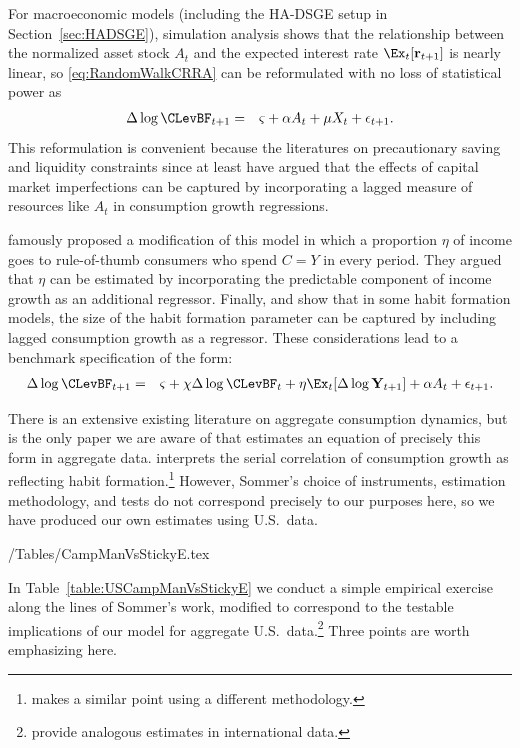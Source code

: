 \documentclass[titlepage]{\econtex}\newcommand{\texname}{cAndCwithStickyE}
\begin{document}
For macroeconomic models (including the HA-DSGE setup in Section~\ref{sec:HADSGE}), simulation analysis shows that the relationship between the normalized asset stock $A_{t}$ and the expected interest rate $\Ex_{t}[\mathbf{r}_{t+1}]$ is nearly linear, so \eqref{eq:RandomWalkCRRA} can be reformulated with no loss of statistical power as
\begin{eqnarray*}
  \label{eq:RandomWalkAForm}
  \Delta \log \CLevBF_{t+1} & = & \varsigma+\alpha A_{t}+\mu X_{t}+\epsilon_{t+1}.
\end{eqnarray*}
This reformulation is convenient because the literatures on precautionary saving and liquidity constraints since at least \cite{zeldes:jpe,zeldesStochastic} have argued that the effects of capital market imperfections can be captured by incorporating a lagged measure of resources like $A_{t}$ in consumption growth regressions.

\cite{cmModel} famously proposed a modification of this model in which a proportion $\eta$ of income goes to rule-of-thumb consumers who spend $C=Y$ in every period.  They argued that $\eta$ can be estimated by incorporating the predictable component of income growth as an additional regressor.  Finally, \cite{dynanHabits} and \cite{som07} show that in some habit formation models, the size of the habit formation parameter can be captured by including lagged consumption growth as a regressor.  These considerations lead to a benchmark specification of the form:
\begin{eqnarray}
  \label{eq:CGrowBench}
  \Delta \log \CLevBF_{t+1} & = & \varsigma+\chi \Delta \log \CLevBF_{t}+\eta \Ex_{t}[\Delta \log \mathbf{Y}_{t+1}]+\alpha A_{t}+\epsilon_{t+1}.
\end{eqnarray}

There is an extensive existing literature on aggregate consumption dynamics, but \cite{som07} is the only paper we are aware of that estimates an equation of precisely this form in aggregate data.  \cite{som07} interprets the serial correlation of consumption growth as reflecting habit formation.\footnote{\cite{weber:ruleofthumb} makes a similar point using a different methodology.}  However, Sommer's choice of instruments, estimation methodology, and tests do not correspond precisely to our purposes here, so we have produced our own estimates using U.S.\ data.

\econtexRoot/Tables/CampManVsStickyE.tex

In Table~\ref{table:USCampManVsStickyE} we conduct a simple empirical exercise along the lines of Sommer's work, modified to correspond to the testable implications of our model for aggregate U.S.\ data.\footnote{\cite{cssIntlStickyC} provide analogous estimates in international data.}  Three points are worth emphasizing here.
\end{document}
